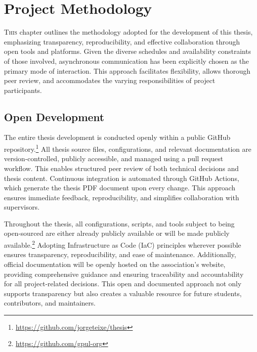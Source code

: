 %

\chapter{Project Methodology}
\label{chap:project_methodology}

\lettrine{T}{his} chapter outlines the methodology adopted for the development of this thesis, emphasizing transparency, reproducibility, and effective collaboration through open tools and platforms. Given the diverse schedules and availability constraints of those involved, asynchronous communication has been explicitly chosen as the primary mode of interaction. This approach facilitates flexibility, allows thorough peer review, and accommodates the varying responsibilities of project participants.

\section{Open Development}

The entire thesis development is conducted openly within a public GitHub repository.\footnote{\url{https://github.com/jorgeteixe/thesis}} All thesis source files, configurations, and relevant documentation are version-controlled, publicly accessible, and managed using a pull request workflow. This enables structured peer review of both technical decisions and thesis content. Continuous integration is automated through GitHub Actions, which generate the thesis PDF document upon every change. This approach ensures immediate feedback, reproducibility, and simplifies collaboration with supervisors.

Throughout the thesis, all configurations, scripts, and tools subject to being open-sourced are either already publicly available or will be made publicly available.\footnote{\url{https://github.com/gpul-org}} Adopting Infrastructure as Code (IaC) principles wherever possible ensures transparency, reproducibility, and ease of maintenance. Additionally, official documentation will be openly hosted on the association's website, providing comprehensive guidance and ensuring traceability and accountability for all project-related decisions. This open and documented approach not only supports transparency but also creates a valuable resource for future students, contributors, and maintainers.
